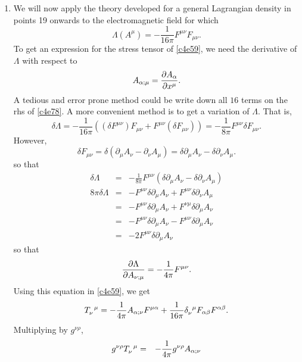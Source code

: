 \begin{enumerate}
\item We will now apply the theory developed for a general Lagrangian density
in points 19 onwards to the electromagnetic field for which
\begin{equation}\label{c4e76}
\Lambda(A^\mu) = -\frac{1}{16\pi}F^{\mu\nu}F_{\mu\nu}.
\end{equation}
To get an expression for the stress tensor of \eqref{c4e59}, we need the 
derivative of $\Lambda$ with respect to 
\[
A_{\alpha; \mu} = \frac{\partial{A_\alpha}}{\partial{x^\mu}}.
\]
A tedious and error prone method could be write down all $16$ terms on the rhs 
of \eqref{c4e78}. A more convenient method is to get a variation of $\Lambda$. 
That is,
\begin{equation}\label{c4e77}
\delta\Lambda = -\frac{1}{16\pi}\left((\delta F^{\mu\nu})F_{\mu\nu} + 
F^{\mu\nu}(\delta F_{\mu\nu})\right) = 
-\frac{1}{8\pi}F^{\mu\nu}\delta F_{\mu\nu}.
\end{equation}
However,
\begin{equation}\label{c4e78}
\delta F_{\mu\nu} = \delta(\partial_\mu A_\nu - \partial_\nu A_\mu)
= \delta\partial_\mu A_\nu - \delta\partial_\nu A_\mu.
\end{equation}
so that
\begin{eqnarray}
\delta\Lambda &=& -\frac{1}{8\pi}F^{\mu\nu}(\delta\partial_\mu A_\nu - 
	\delta\partial_\nu A_\mu) \nonumber \\
8\pi\delta\Lambda &=& -F^{\mu\nu}\delta\partial_\mu A_\nu + 
	F^{\mu\nu}\delta\partial_\nu A_\mu \nonumber \\
 &=& -F^{\mu\nu}\delta\partial_\mu A_\nu + F^{\nu\mu}\delta\partial_\mu 
 	A_\nu \nonumber \\
 &=& -F^{\mu\nu}\delta\partial_\mu A_\nu - F^{\mu\nu}\delta\partial_\mu A_\nu 
 \nonumber \\
 &=& -2F^{\mu\nu}\delta\partial_\mu A_\nu \label{c4e79}
\end{eqnarray}
so that
\begin{equation}\label{c4e80}
\frac{\partial{\Lambda}}{\partial{A_{\nu;\mu}}} = -\frac{1}{4\pi}F^{\mu\nu}.
\end{equation}
Using this equation in \eqref{c4e59}, we get
\begin{equation}\label{c4e81}
\tensor{T}{_\nu^\mu} = -\frac{1}{4\pi}A_{\alpha;\nu}F^{\mu\alpha} +
\frac{1}{16\pi}\tensor{\delta}{_\nu^\mu} F_{\alpha\beta}F^{\alpha\beta}.
\end{equation}
Multiplying by $g^{\nu\rho}$,
\begin{eqnarray}
g^{\nu\rho}\tensor{T}{_\nu^\mu} &=& -\frac{1}{4\pi}g^{\nu\rho}A_{\alpha;\nu}

\end{eqnarray}
\end{enumerate}
